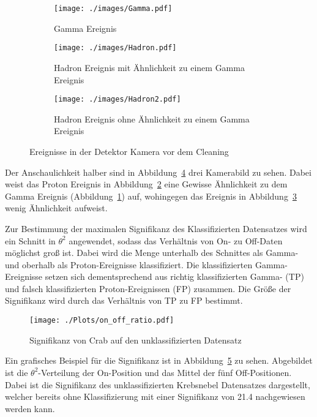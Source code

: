 \begin{figure}[H]
  \centering
\begin{subfigure}[t]{0.3\textwidth}
  \centering
  \texttt{[image: ./images/Gamma.pdf]}
  \caption{Gamma Ereignis}
  \label{fig:gammaevent}
\end{subfigure}
\begin{subfigure}[t]{0.3\textwidth}
  \centering
  \texttt{[image: ./images/Hadron.pdf]}
  \caption{Hadron Ereignis mit Ähnlichkeit zu einem Gamma Ereignis}
  \label{fig:hadevent}
\end{subfigure}
\begin{subfigure}[t]{0.3\textwidth}
  \centering
  \texttt{[image: ./images/Hadron2.pdf]}
  \caption{Hadron Ereignis ohne Ähnlichkeit zu einem Gamma Ereignis}
  \label{fig:had2event}
\end{subfigure}
\caption{Ereignisse in der Detektor Kamera vor dem Cleaning \cite{campic}}
\label{fig:picevents}
\end{figure}
Der Anschaulichkeit halber sind in Abbildung~\ref{fig:picevents} drei Kamerabild zu sehen.
Dabei weist das Proton Ereignis in Abbildung~\ref{fig:hadevent} eine Gewisse Ähnlichkeit zu dem Gamma Ereignis (Abbildung~\ref{fig:gammaevent}) auf, wohingegen das Ereignis in Abbildung~\ref{fig:had2event} wenig Ähnlichkeit aufweist.

Zur Bestimmung der maximalen Signifikanz des Klassifizierten Datensatzes wird ein Schnitt in $\theta^{2}$ angewendet, sodass das Verhältnis von On- zu Off-Daten möglichst groß ist.
Dabei wird die Menge unterhalb des Schnittes als Gamma- und oberhalb als Proton-Ereignisse klassifiziert.
Die klassifizierten Gamma-Ereignisse setzen sich dementsprechend aus richtig klassifizierten Gamma- (TP) und falsch klassifizierten Proton-Ereignissen (FP) zusammen. 
Die Größe der Signifikanz wird durch das Verhältnis von TP zu FP bestimmt.
\begin{figure}[H]
  \centering
  \texttt{[image: ./Plots/on\_off\_ratio.pdf]}
  \caption{Signifikanz von Crab auf den unklassifizierten Datensatz}
  \label{fig:sig_crab}
\end{figure}
Ein grafisches Beispiel für die Signifikanz ist in Abbildung~\ref{fig:sig_crab} zu sehen. 
Abgebildet ist die $\theta^{2}$-Verteilung der On-Position und das Mittel der fünf Off-Positionen.
Dabei ist die Signifikanz des unklassifizierten Krebsnebel Datensatzes dargestellt, welcher bereits ohne Klassifizierung mit einer Signifikanz von \SI{21,4}{\sigma} nachgewiesen werden kann.

